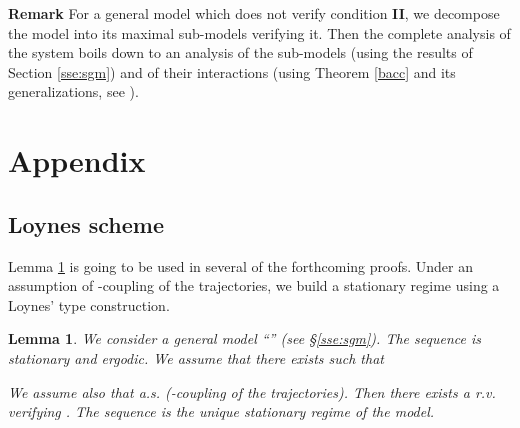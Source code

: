 \documentclass[11pt,titlepage]{article}
\newcommand{\parag}{\medskip\noindent}
\newtheorem{lemm}[theo]{Lemma }
\begin{document}
\parag

{\bf Remark }
For a general model which does not verify condition {\bf II}, we decompose the
model into its maximal sub-models verifying it. Then the complete analysis of
the system boils down to an analysis of the sub-models (using the results of
Section \ref{sse:sgm}) and of their interactions (using Theorem \ref{bacc} and
its generalizations, see \cite{bacc92}).

\section{Appendix}
\label{se:app}
\subsection{Loynes scheme}\label{sse:ls}
Lemma \ref{le:loyn} is going to be used in several of the 
forthcoming proofs. Under an assumption of -coupling of the
trajectories, we build a stationary regime using a Loynes' type 
construction. 

\begin{lemm}
\label{le:loyn}
We consider a general model ``''
(see \S \ref{sse:sgm}). The sequence  is 
stationary and ergodic. We assume that there exists  such that 

We assume also that  a.s. (-coupling of the
trajectories). Then there exists a r.v. 
 verifying
.
The sequence  is the unique
stationary regime of the model.
\end{lemm}
\end{document}
